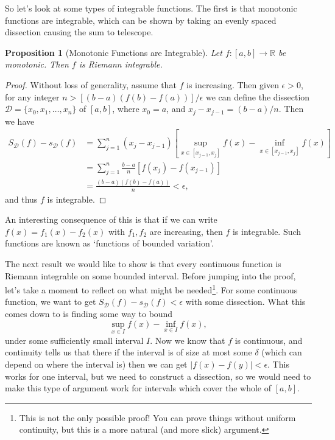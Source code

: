 \documentclass[11pt, a4paper]{article}
\newtheorem{proposition}[theorem]{Proposition}
\theoremstyle{definition}
\newcommand{\R}{\mathbb{R}}
\newcommand{\DD}{\mathcal{D}}
\begin{document}
So let's look at some types of integrable functions. The first is that monotonic functions are integrable, which can be shown by taking an evenly spaced dissection causing the sum to telescope.

\begin{proposition}[Monotonic Functions are Integrable]
	Let $f:[a, b] \rightarrow \R$ be monotonic. Then $f$ is Riemann integrable.
\end{proposition}
\begin{proof}
	Without loss of generality, assume that $f$ is increasing. Then given $\epsilon > 0$, for any integer $n > [(b - a)(f(b)- f(a))]/\epsilon$ we can define the dissection $\DD = \{x_0, x_1, \dots, x_n\}$ of $[a, b]$, where $x_0 = a$, and $x_{j} - x_{j - 1} = (b - a)/n$. Then we have
	\begin{align*}
		S_{\DD}(f) - s_{\DD}(f) &= \sum_{j = 1}^n (x_{j} - x_{j - 1})\left[\sup_{x \in [x_{j - 1}, x_j]} f(x) - \inf_{x \in [x_{j - 1}, x_j]} f(x)\right] \\
&= \sum_{j = 1}^n \frac{b - a}{n}\left[f(x_j) - f(x_{j - 1})\right] \\
&= \frac{(b - a)(f(b) - f(a))}{n} < \epsilon,
	\end{align*}
	and thus $f$ is integrable.
\end{proof}

An interesting consequence of this is that if we can write $f(x) = f_1(x) - f_2(x)$ with $f_1, f_2$ are increasing, then $f$ is integrable. Such functions are known as `functions of bounded variation'. 

The next result we would like to show is that every continuous function is Riemann integrable on some bounded interval. Before jumping into the proof, let's take a moment to reflect on what might be needed\footnote{This is not the only possible proof! You can prove things without uniform continuity, but this is a more natural (and more slick) argument.}. For some continuous function, we want to get $S_{\DD}(f) - s_{\DD}(f) < \epsilon$ with some dissection. What this comes down to is finding some way to bound
$$
\sup_{x \in I}f(x) - \inf_{x \in I} f(x),
$$
under some sufficiently small interval $I$. 
Now we know that $f$ is continuous, and continuity tells us that there if the interval is of size at most some $\delta$ (which can depend on where the interval is) then we can get $|f(x) - f(y)| < \epsilon$. 
This works for one interval, but we need to construct a dissection, so we would need to make this type of argument work for intervals which cover the whole of $[a, b]$.
\end{document}
